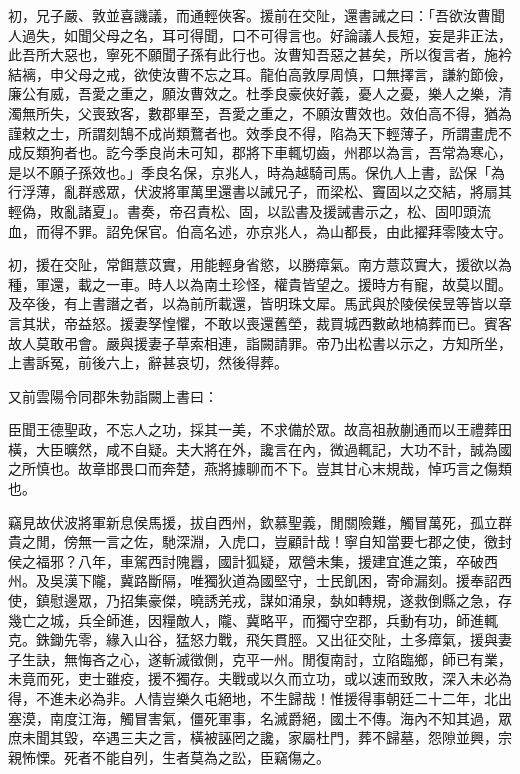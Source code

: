 \begin{pinyinscope}
初，兄子嚴、敦並喜譏議，而通輕俠客。援前在交阯，還書誡之曰：「吾欲汝曹聞人過失，如聞父母之名，耳可得聞，口不可得言也。好論議人長短，妄是非正法，此吾所大惡也，寧死不願聞子孫有此行也。汝曹知吾惡之甚矣，所以復言者，施衿結褵，申父母之戒，欲使汝曹不忘之耳。龍伯高敦厚周慎，口無擇言，謙約節儉，廉公有威，吾愛之重之，願汝曹效之。杜季良豪俠好義，憂人之憂，樂人之樂，清濁無所失，父喪致客，數郡畢至，吾愛之重之，不願汝曹效也。效伯高不得，猶為謹敕之士，所謂刻鵠不成尚類鶩者也。效季良不得，陷為天下輕薄子，所謂畫虎不成反類狗者也。訖今季良尚未可知，郡將下車輒切齒，州郡以為言，吾常為寒心，是以不願子孫效也。」季良名保，京兆人，時為越騎司馬。保仇人上書，訟保「為行浮薄，亂群惑眾，伏波將軍萬里還書以誡兄子，而梁松、竇固以之交結，將扇其輕偽，敗亂諸夏」。書奏，帝召責松、固，以訟書及援誡書示之，松、固叩頭流血，而得不罪。詔免保官。伯高名述，亦京兆人，為山都長，由此擢拜零陵太守。

初，援在交阯，常餌薏苡實，用能輕身省慾，以勝瘴氣。南方薏苡實大，援欲以為種，軍還，載之一車。時人以為南土珍怪，權貴皆望之。援時方有寵，故莫以聞。及卒後，有上書譖之者，以為前所載還，皆明珠文犀。馬武與於陵侯侯昱等皆以章言其狀，帝益怒。援妻孥惶懼，不敢以喪還舊塋，裁買城西數畝地槁葬而已。賓客故人莫敢弔會。嚴與援妻子草索相連，詣闕請罪。帝乃出松書以示之，方知所坐，上書訴冤，前後六上，辭甚哀切，然後得葬。

又前雲陽令同郡朱勃詣闕上書曰：

臣聞王德聖政，不忘人之功，採其一美，不求備於眾。故高祖赦蒯通而以王禮葬田橫，大臣曠然，咸不自疑。夫大將在外，讒言在內，微過輒記，大功不計，誠為國之所慎也。故章邯畏口而奔楚，燕將據聊而不下。豈其甘心末規哉，悼巧言之傷類也。

竊見故伏波將軍新息侯馬援，拔自西州，欽慕聖義，閒關險難，觸冒萬死，孤立群貴之閒，傍無一言之佐，馳深淵，入虎口，豈顧計哉！寧自知當要七郡之使，徼封侯之福邪？八年，車駕西討隗囂，國計狐疑，眾營未集，援建宜進之策，卒破西州。及吳漢下隴，冀路斷隔，唯獨狄道為國堅守，士民飢困，寄命漏刻。援奉詔西使，鎮慰邊眾，乃招集豪傑，曉誘羌戎，謀如涌泉，埶如轉規，遂救倒縣之急，存幾亡之城，兵全師進，因糧敵人，隴、冀略平，而獨守空郡，兵動有功，師進輒克。銖鋤先零，緣入山谷，猛怒力戰，飛矢貫脛。又出征交阯，土多瘴氣，援與妻子生訣，無悔吝之心，遂斬滅徵側，克平一州。閒復南討，立陷臨鄉，師已有業，未竟而死，吏士雖疫，援不獨存。夫戰或以久而立功，或以速而致敗，深入未必為得，不進未必為非。人情豈樂久屯絕地，不生歸哉！惟援得事朝廷二十二年，北出塞漠，南度江海，觸冒害氣，僵死軍事，名滅爵絕，國土不傳。海內不知其過，眾庶未聞其毀，卒遇三夫之言，橫被誣罔之讒，家屬杜門，葬不歸墓，怨隙並興，宗親怖慄。死者不能自列，生者莫為之訟，臣竊傷之。


\end{pinyinscope}
